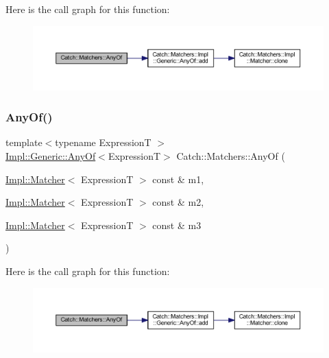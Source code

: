 Here is the call graph for this function\+:\nopagebreak
\begin{figure}[H]
\begin{center}
\leavevmode
\includegraphics[width=350pt]{namespace_catch_1_1_matchers_a9cb139c71b9e391d5fc017764695bf84_cgraph}
\end{center}
\end{figure}
\hypertarget{namespace_catch_1_1_matchers_a8efb0e533db973b8aff1172fb908db02}{}\label{namespace_catch_1_1_matchers_a8efb0e533db973b8aff1172fb908db02} 
\subsubsection{\texorpdfstring{Any\+Of()}{AnyOf()}\hspace{0.1cm}{\footnotesize\ttfamily [2/2]}}
{\footnotesize\ttfamily template$<$typename ExpressionT $>$ \\
\hyperlink{class_catch_1_1_matchers_1_1_impl_1_1_generic_1_1_any_of}{Impl\+::\+Generic\+::\+Any\+Of}$<$ExpressionT$>$ Catch\+::\+Matchers\+::\+Any\+Of (\begin{DoxyParamCaption}\item[{\hyperlink{struct_catch_1_1_matchers_1_1_impl_1_1_matcher}{Impl\+::\+Matcher}$<$ ExpressionT $>$ const \&}]{m1,  }\item[{\hyperlink{struct_catch_1_1_matchers_1_1_impl_1_1_matcher}{Impl\+::\+Matcher}$<$ ExpressionT $>$ const \&}]{m2,  }\item[{\hyperlink{struct_catch_1_1_matchers_1_1_impl_1_1_matcher}{Impl\+::\+Matcher}$<$ ExpressionT $>$ const \&}]{m3 }\end{DoxyParamCaption})\hspace{0.3cm}{\ttfamily [inline]}}

Here is the call graph for this function\+:\nopagebreak
\begin{figure}[H]
\begin{center}
\leavevmode
\includegraphics[width=350pt]{namespace_catch_1_1_matchers_a8efb0e533db973b8aff1172fb908db02_cgraph}
\end{center}
\end{figure}
\hypertarget{namespace_catch_1_1_matchers_a07760045eca8bafb7f6618fae10f1b59}{}\label{namespace_catch_1_1_matchers_a07760045eca8bafb7f6618fae10f1b59} 
